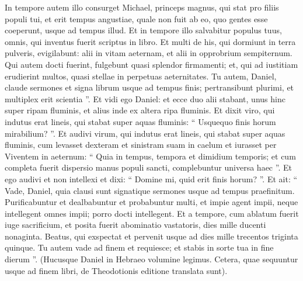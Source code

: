 \begin{biblechapter}
\begin{biblechapter}
\begin{biblechapter}
\begin{biblechapter}
\begin{biblechapter}
\begin{biblechapter}
\begin{biblechapter}
\begin{biblechapter}
\begin{biblechapter}
\begin{biblechapter}
\begin{biblechapter}
\begin{biblechapter}
\verse In tempore autem illo consurget Michael, princeps magnus, qui stat pro filiis populi tui, et erit tempus angustiae, quale non fuit ab eo, quo gentes esse coeperunt, usque ad tempus illud. Et in tempore illo salvabitur populus tuus, omnis, qui inventus fuerit scriptus in libro. 
\verse Et multi de his, qui dormiunt in terra pulveris, evigilabunt: alii in vitam aeternam, et alii in opprobrium sempiternum. 
\verse Qui autem docti fuerint, fulgebunt quasi splendor firmamenti; et, qui ad iustitiam erudierint multos, quasi stellae in perpetuas aeternitates. 
\verse Tu autem, Daniel, claude sermones et signa librum usque ad tempus finis; pertransibunt plurimi, et multiplex erit scientia ”. 
\verse Et vidi ego Daniel: et ecce duo alii stabant, unus hinc super ripam fluminis, et alius inde ex altera ripa fluminis. 
\verse Et dixit viro, qui indutus erat lineis, qui stabat super aquas fluminis: “ Usquequo finis horum mirabilium? ”. 
\verse Et audivi virum, qui indutus erat lineis, qui stabat super aquas fluminis, cum levasset dexteram et sinistram suam in caelum et iurasset per Viventem in aeternum: “ Quia in tempus, tempora et dimidium temporis; et cum completa fuerit dispersio manus populi sancti, complebuntur universa haec ”. 
\verse Et ego audivi et non intellexi et dixi: “ Domine mi, quid erit finis horum? ”. 
\verse Et ait: “ Vade, Daniel, quia clausi sunt signatique sermones usque ad tempus praefinitum. 
 \verse Purificabuntur et dealbabuntur et probabuntur multi, et impie agent impii, neque intellegent omnes impii; porro docti intellegent. 
\verse Et a tempore, cum ablatum fuerit iuge sacrificium, et posita fuerit abominatio vastatoris, dies mille ducenti nonaginta. 
\verse Beatus, qui exspectat et pervenit usque ad dies mille trecentos triginta quinque. 
\verse Tu autem vade ad finem et requiesce; et stabis in sorte tua in fine dierum ”.
 (Hucusque Daniel in Hebraeo volumine legimus. Cetera, quae sequuntur usque ad finem libri, de Theodotionis editione translata sunt).
 

\end{biblechapter}
\end{biblechapter}
\end{biblechapter}
\end{biblechapter}
\end{biblechapter}
\end{biblechapter}
\end{biblechapter}
\end{biblechapter}
\end{biblechapter}
\end{biblechapter}
\end{biblechapter}
\end{biblechapter}
